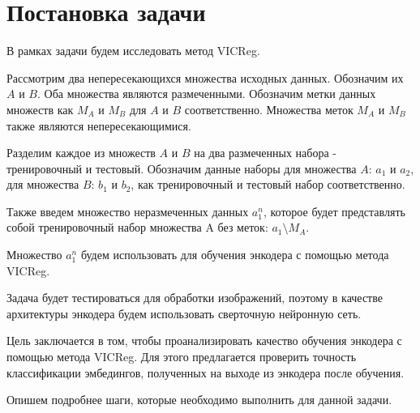 \section{Постановка задачи}
\label{sec:Chapter3} 

В рамках задачи будем исследовать метод VICReg.


Рассмотрим два непересекающихся множества исходных данных. Обозначим их $A$ и $B$. Оба множества являются размеченными. Обозначим метки данных множеств как $M_A$ и $M_B$ для $A$ и $B$ соответственно. Множества меток $M_A$ и $M_B$ также являются непересекающимися. 

Разделим каждое из множеств $A$ и $B$ на два размеченных набора - тренировочный и тестовый. Обозначим данные наборы для множества $A$: $a_1$ и $a_2$, для множества $B$: $b_1$ и $b_2$, как тренировочный и тестовый набор соответственно.

Также введем множество неразмеченных данных $a_1^n$, которое будет представлять собой тренировочный набор множества A без меток: $a_1 \setminus M_A$.

Множество $a_1^n$ будем использовать для обучения энкодера с помощью метода VICReg. 

Задача будет тестироваться для обработки изображений, поэтому в качестве архитектуры энкодера будем использовать сверточную нейронную сеть.


Цель заключается в том, чтобы проанализировать качество обучения энкодера с помощью метода VICReg. Для этого предлагается проверить точность классификации эмбедингов, полученных на выходе из энкодера после обучения. 


Опишем подробнее шаги, которые необходимо выполнить для данной задачи.

